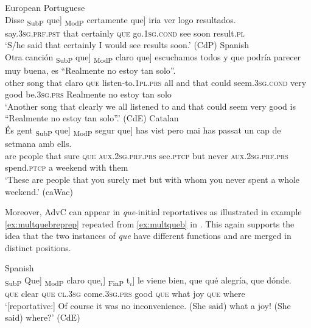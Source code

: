 \ea 
\ea\label{ex:advqueembeda} European Portuguese \\
\gll  Disse {\ob}\textsubscript{SubP} que]  {\ob}\textsubscript{ModP} certamente que] iria ver logo resultados. \\
say.\textsc{3sg.prf.pst}  {} that {} certainly \textsc{que} go.\textsc{1sg.cond} see soon result.\textsc{pl}\\
\glt `S/he said that certainly I would  see results soon.' (CdP)
	\ex\label{ex:advqueembedb}
			Spanish\\
			 \gll  Otra canción {\ob}\textsubscript{SubP} que]  {\ob}\textsubscript{ModP} claro {que}] escuchamos todos y que podría parecer muy buena, es ``Realmente no estoy tan solo''. \\ 
 other song {} that {} claro \textsc{que} listen-to.\textsc{1pl.prs} all and that could seem.\textsc{3sg.cond} very good be.\textsc{3sg.prs} Realmente no estoy tan solo\\
\glt `Another song that clearly we all listened to and that could seem very good is ``Realmente no estoy tan solo''.' (CdE)
\ex\label{ex:advqueembedc}
Catalan\\
\gll És gent {\ob}\textsubscript{SubP} que] {\ob}\textsubscript{ModP} segur que] has vist pero mai has passat un {cap de  setmana} amb ells. \\
are people {} that {} sure \textsc{que} \textsc{aux.2sg.prf.prs} see.\textsc{ptcp} but never \textsc{aux.2sg.prf.prs} spend.\textsc{ptcp} a weekend with them\\
\glt `These are people that you surely met but with whom you never spent a whole weekend.' (caWac)
\z
\z

Moreover,  AdvC can  appear in \emph{que}-initial reportatives as illustrated in  example \eqref{ex:multquebreprep} repeated  from \eqref{ex:multqueb} in . This again supports the idea that the two instances of \emph{que} have different functions and are merged in distinct positions.

\ea\label{ex:multquebreprep}
		Spanish\\
\gll {\ob}\textsubscript{SubP} Que]  {\ob}\textsubscript{ModP} claro que$_i$] {\ob}\textsubscript{FinP} t$_i$] le viene bien, que qué alegría, que dónde. \\
{} \textsc{que} {} clear \textsc{que} {} {} \textsc{cl.3sg} come.\textsc{3sg.prs} good \textsc{que} what joy \textsc{que} where \\
\glt `[reportative:] Of course it was no inconvenience. (She said) what a joy! (She said) where?' (CdE)
\z

